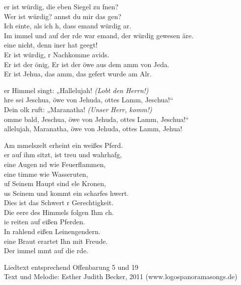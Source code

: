 
er ist würdig, die eben Siegel zu fnen?\\
Wer ist würdig? annst du mir das gen?\\
Ich einte, als ich h, dass emand würdig ar.\\
Im immel und auf der rde war emand, der würdig gewesen äre.\\

eine nicht, denn iner hat geegt!\\
Er ist würdig, r Nachkomme avids.\\
Er ist der önig, Er ist der öwe aus dem amm von Jeda.\\
Er ist Jehua, das amm, das gefert wurde am Alr.

\begin{tabbing}
er Himmel singt: „Hallelujah! \hspace{30px} \=   \textit{(Lobt den Herrn!)}\\
hre sei Jeschua, öwe von Jehuda, ottes Lamm, Jeschua!“\\
Dein olk ruft: „Maranatha! \>  \textit{(Unser Herr, komm!)}\\
omme bald, Jeschua, öwe von Jehuda, ottes Lamm, Jeschua!“\\
allelujah, Maranatha, öwe von Jehuda, ottes Lamm, Jehua!
\end{tabbing}

Am mmelszelt erheint ein weißes Pferd.\\
er auf ihm sitzt, ist treu und wahrhafg,\\
eine Augen nd wie Feuerflammen,\\
eine timme wie Wasseruten,\\
uf Seinem Haupt sind ele Kronen,\\
us Seinem und kommt ein scharfes hwert.\\
Dies ist das Schwert r Gerechtigkeit.\\
Die eere des Himmels folgen Ihm ch.\\
ie reiten auf eißen Pferden. \\
In rahlend eißen Leinengendern.\\
eine Braut erartet Ihn mit Freude. \\
Der immel mmt auf die rde.\\

\begin{footnotesize}
Liedtext entsprechend Offenbarung 5 und 19\\
Text und Melodie: Esther Judith Becker, 2011 (www.logospanoramasongs.de)
\end{footnotesize}